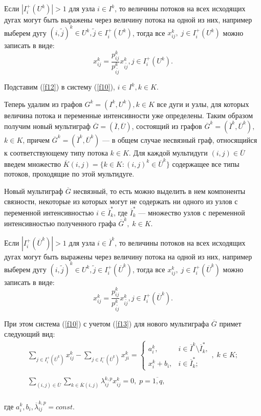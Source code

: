 \documentclass[14pt]{extarticle}%
\begin{document}
Если $|I^+_i(U^k)|>1$ для узла $i\in I^k$, то величины потоков на всех исходящих дугах могут быть выражены через величину потока на одной из них, например выберем дугу $(i, \tilde j)^k\in U^k, \tilde j\in I_i^+(U^k)$, тогда все $x^k_{ij},\;j\in I^+_i(U^k)$ можно записать в виде:
\begin{equation}
    x^k_{ij}=\frac{p^k_{ij}}{p^k_{i\tilde j}}x^k_{i\tilde j}, j\in I^+_i(U^k).\label{f12}
\end{equation}

Подставим (\ref{f12}) в систему (\ref{f10}), $i\in I^k, k\in K$.

Теперь удалим из графов $G^k=(I^k, U^k), k\in K$ все дуги и узлы, для которых величина потока и переменные интенсивности уже определены. Таким образом получим новый мультиграф $\overline G=(\overline I, \overline U)$, состоящий из графов $\overline G^k=(\overline I^k, \overline U^k),$ \\$k\in K$, причем $\overline G^k=(\overline I^k, \overline U^k)$ --- в общем случае несвязный граф, относящийся к соответствующему типу потока $k\in K$. Для каждой мультидуги $(i,j)\in \overline U$ введем множество $\overline K(i,j)=\{k\in K:(i,j)^k\in \overline U^k\}$ содержащее все типы потоков, проходящие по этой мультидуге.

Новый мультиграф $\overline G$ несвязный, то есть можно выделить в нем компоненты связности, некоторые из которых могут не содержать ни одного из узлов с переменной интенсивностью $i \in \overline I^*_k$, где $\overline I^*_k$ --- множество узлов с переменной интенсивностью полученного графа $\overline G^k,\;k\in K$.

Если $|I^+_i(\overline U^k)|>1$ для узла $i\in \overline I^k$, то величины потоков на всех исходящих дугах могут быть выражены через величину потока на одной из них, например выберем дугу $(i, \tilde j)^k\in U^k, \tilde j\in I_i^+(\overline U^k)$, тогда все $x^k_{ij},\;j\in I^+_i(\overline U^k)$ можно записать в виде:
\begin{equation}
    x^k_{ij}=\frac{p^k_{ij}}{p^k_{i\tilde j}}x^k_{i\tilde j}, j\in I^+_i(\overline U^k).\label{f13}
\end{equation}

При этом система (\ref{f10}) с учетом (\ref{f13}) для нового мультиграфа $\overline G$ примет следующий вид:
\begin{equation}
\begin{gathered}
\sum_{j\in I^+_i(\overline U^k)} x^k_{ij}-\sum_{j\in I^-_i(\overline U^k)}x^k_{ji}=\left\{\begin{matrix}
a^k_i, & i\in\overline I^k\setminus \overline I^*_k,\\ 
x^k_i+b_i, & i\in \overline I^*_k;
\end{matrix}\right.,\; k\in K;\\ \\
\sum_{(i,j)\in\overline U}\sum_{k\in \overline K(i,j)}\lambda^{k,p}_{ij}x^k_{ij}=0,\; p=\overline{1,q},
\end{gathered}\label{f14}
\end{equation}\\
где $a^k_i, b_i, \overline\lambda^{k,p}_{ij}=const$.
\end{document}
